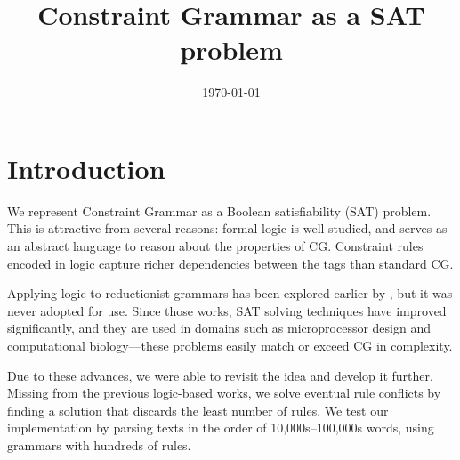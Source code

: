 \documentclass[11pt]{article}
\title{Constraint Grammar as a SAT problem}
\date{\today}
\begin{document}
\maketitle



\section{Introduction}

We represent Constraint Grammar \cite{karlsson1995constraint} 
as a Boolean satisfiability (SAT) problem.
This is attractive from several reasons: formal logic is
well-studied, and serves as an abstract language to reason about the
properties of CG. Constraint rules encoded in logic capture richer
dependencies between the tags than standard CG.

Applying logic to reductionist grammars has been explored earlier by \cite{lager98,lager_nivre01}, but it was never adopted for use.
Since those works, SAT solving techniques have improved significantly, and 
they are used in domains such as microprocessor design and computational 
biology---these problems easily match or exceed CG in complexity. 

Due to these advances, we were able to revisit the idea and develop it further. 
Missing from the previous logic-based works, 
we solve eventual rule conflicts by finding a solution that 
discards the least number of rules.
We test our implementation by parsing texts in the order of 10,000s--100,000s
words, using grammars with hundreds of rules.







\end{document}
